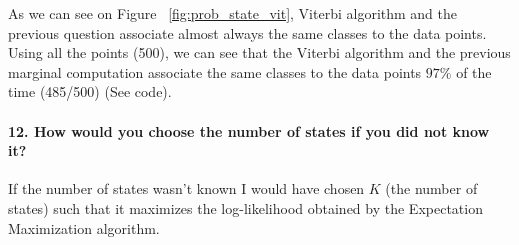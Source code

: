 \documentclass[11pt]{article}
\numberwithin{figure}{section} %
\begin{document}
As we can see on Figure ~\ref{fig:prob_state_vit}, Viterbi algorithm and the previous question associate almost always the same classes to the data points. Using all the points (500), we can see that the Viterbi algorithm and the previous marginal computation associate the same classes to the data points $97\%$ of the time (485/500) (See code).

\paragraph{12. How would you choose the number of states if you did not know it?}

If the number of states wasn't known I would have chosen $K$ (the number of states) such that it maximizes the log-likelihood obtained by the Expectation Maximization algorithm.
\end{document}
